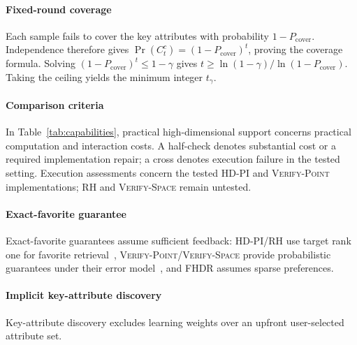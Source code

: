 \documentclass[conference]{IEEEtran}
\theoremstyle{definition}
\theoremstyle{plain}
\begin{document}
\paragraph{Fixed-round coverage}
Each sample fails to cover the key attributes with probability $1-P_\text{cover}$. Independence therefore gives $\Pr(C_t^c)=(1-P_\text{cover})^t$, proving the coverage formula. Solving $(1-P_\text{cover})^t\leq1-\gamma$ gives $t\geq\ln(1-\gamma)/\ln(1-P_\text{cover})$. Taking the ceiling yields the minimum integer $t_\gamma$.

\iftoggle{TechnicalReport}
  {\section{Capability Qualifications and Reproduction Results}}
  {\section{Capability Qualifications}}
\label{appen:capabilities}

\paragraph{Comparison criteria}
In Table~\ref{tab:capabilities}, practical high-dimensional support concerns practical computation and interaction costs. A half-check denotes substantial cost or a required implementation repair; a cross denotes execution failure in the tested setting. Execution assessments concern the tested \textsc{HD-PI} and \textsc{Verify-Point} implementations; \textsc{RH} and \textsc{Verify-Space} remain untested.

\paragraph{Exact-favorite guarantee}
Exact-favorite guarantees assume sufficient feedback: \textsc{HD-PI}/\textsc{RH} use target rank one for favorite retrieval~\cite{WWX21}, \textsc{Verify-Point}/\textsc{Verify-Space} provide probabilistic guarantees under their error model~\cite{CW23}, and FHDR assumes sparse preferences.

\paragraph{Implicit key-attribute discovery}
Key-attribute discovery excludes learning weights over an upfront user-selected attribute set.
\end{document}
